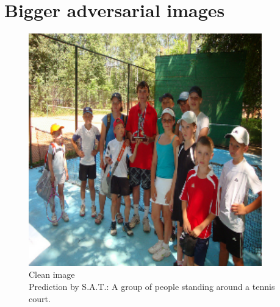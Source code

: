 \section{Bigger adversarial images} \label{big_images_with_noise}

\begin{figure}[ht]
    \centering
    \begin{minipage}{0.45\textwidth}
        \centering
        \includegraphics[width=0.9\textwidth]{figures/group_of_people/group_of_people_0.000.png} %
        \caption*{Clean image\\Prediction by S.A.T.: A group of people standing around a tennis court.}
    \end{minipage}\hfill
    \begin{minipage}{0.45\textwidth}
        \centering

\end{minipage}
\end{figure}
